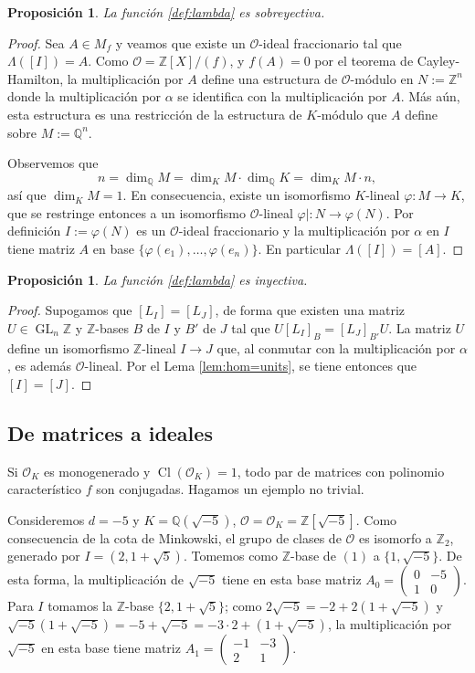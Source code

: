 \documentclass[11pt,a4paper]{amsart}
\newcommand{\Q}{\mathbb{Q}}
\newcommand{\Z}{\mathbb{Z}}
\DeclareMathOperator{\GL}{GL}
\DeclareMathOperator{\CL}{Cl}
\numberwithin{equation}{section}
\theoremstyle{plain}
\newtheorem{prop}[equation]{Proposición}
\renewcommand{\O}{\mathcal{O}}
\begin{document}
\begin{prop} La función \eqref{def:lambda} es sobreyectiva.
\end{prop}
\begin{proof} Sea $A \in M_f$ y veamos que existe un $\O$-ideal
fraccionario tal que $\Lambda([I]) = A$. Como $\O = \Z[X]/(f)$,
y $f(A) = 0$ por el teorema de Cayley-Hamilton,
la multiplicación por $A$ define una estructura de $\O$-módulo
en $N:= \Z^n$ donde la multiplicación por $\alpha$ se identifica con
la multiplicación por $A$. Más aún, esta estructura
es una restricción de la estructura
de $K$-módulo que $A$ define sobre $M := \Q^n$.

Observemos que
\[
n = \dim_{\Q} M = \dim_K M \cdot \dim_\Q K = \dim_K M \cdot n,
\]
así que $\dim_K M = 1$. En consecuencia, existe un isomorfismo
$K$-lineal $\varphi \colon M \to K$, que se restringe
entonces a un isomorfismo $\O$-lineal $\varphi| \colon N \to \varphi(N)$.
Por definición $I := \varphi(N)$ es un $\O$-ideal fraccionario y
la multiplicación por $\alpha$ en $I$ tiene matriz $A$ en base
$\{\varphi(e_1), \ldots, \varphi(e_n)\}$. En particular
$\Lambda([I]) = [A]$.
\end{proof}

\begin{prop} La función \eqref{def:lambda} es inyectiva.
\end{prop}
\begin{proof} Supogamos que $[L_I] = [L_J]$, de forma que existen
una matriz $U \in \GL_n \Z$ y $\Z$-bases $B$ de $I$ y $B'$ de $J$
tal que $U [L_I]_{B} = [L_J]_{B'} U$. La matriz $U$ define
un isomorfismo $\Z$-lineal $I \to J$ que, al conmutar con la multiplicación
por $\alpha$, es además $\O$-lineal. Por el Lema \ref{lem:hom=units},
se tiene entonces que $[I] = [J]$.
\end{proof}

\subsection{De matrices a ideales} Si $\O_K$ es monogenerado
y $\CL(\O_K) = 1$, todo par de matrices con polinomio característico
$f$ son conjugadas. Hagamos un ejemplo no trivial.

Consideremos $d = -5$ y $K = \Q(\sqrt{-5})$, $\O = \O_K = \Z[\sqrt{-5}]$.
Como consecuencia de la cota de Minkowski,
el grupo de clases de $\O$ es isomorfo a $\Z_2$, generado por
$I = (2,1+\sqrt{5})$. Tomemos como $\Z$-base de $(1)$ a
$\{1,\sqrt{-5}\}$. De esta forma, la multiplicación de $\sqrt{-5}$
tiene en esta base matriz $A_0 =
\begin{pmatrix}0 & -5\\ 1 & 0\end{pmatrix}$.
Para $I$ tomamos la $\Z$-base $\{2,1+\sqrt{5}\}$;
como $2\sqrt{-5} = -2 + 2(1+\sqrt{-5})$ y $\sqrt{-5}(1+\sqrt{-5}) = -5 +
\sqrt{-5} = -3 \cdot 2 + (1+\sqrt{-5})$, la multiplicación
por $\sqrt{-5}$ en esta base tiene matriz $A_1 = \begin{pmatrix}
-1 & -3\\ 2 & 1 \end{pmatrix}$.
\end{document}
